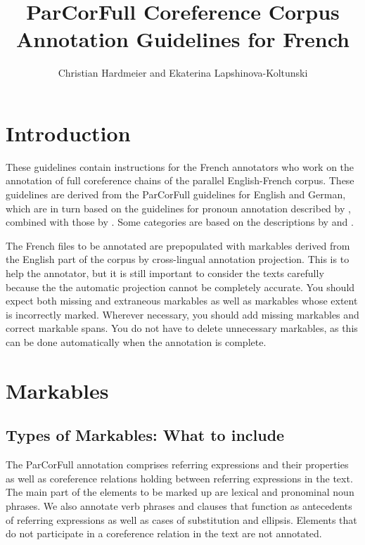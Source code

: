 \documentclass[a4paper]{article}
\title{ParCorFull Coreference Corpus Annotation Guidelines for French}
\author{Christian Hardmeier and Ekaterina Lapshinova-Koltunski}
\begin{document}
\maketitle
\tableofcontents

\section{Introduction}

These guidelines contain instructions for the French annotators who work on the
annotation of full coreference chains of the parallel English-French corpus.
These guidelines are derived from the ParCorFull guidelines for English and
German, which are in turn based on the guidelines for pronoun annotation
described by \cite{GuillouEtAlGuide}, combined with those by
\cite{GrishinaStedeGuide}. Some categories are based on the descriptions by
\cite{Kunz2012} and \cite{NedoluzhkoMirovsky201}.

The French files to be annotated are prepopulated with markables derived from
the English part of the corpus by cross-lingual annotation projection. This is
to help the annotator, but it is still important to consider the texts carefully
because the the automatic projection cannot be completely accurate. You should
expect both missing and extraneous markables as well as markables whose extent
is incorrectly marked. Wherever necessary, you should add missing markables and
correct markable spans. You do not have to delete unnecessary markables, as this
can be done automatically when the annotation is complete.


\section{Markables}

\subsection{Types of Markables: What to include}

The ParCorFull annotation comprises referring expressions and their properties
as well as coreference relations holding between referring expressions in the
text. The main part of the elements to be marked up are lexical and pronominal
noun phrases. We also annotate verb phrases and clauses that function as
antecedents of referring expressions as well as cases of substitution and
ellipsis. Elements that do not participate in a coreference relation in the text
are not annotated.
\end{document}

